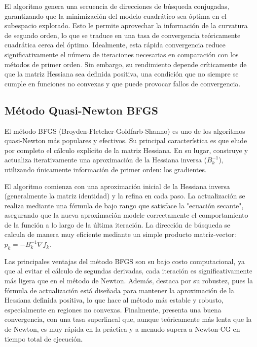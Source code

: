 \documentclass{article}
\begin{document}
El algoritmo genera una secuencia de direcciones de búsqueda conjugadas, garantizando que la minimización del modelo cuadrático sea óptima en el subespacio explorado. Esto le permite aprovechar la información de la curvatura de segundo orden, lo que se traduce en una tasa de convergencia teóricamente cuadrática cerca del óptimo. Idealmente, esta rápida convergencia reduce significativamente el número de iteraciones necesarias en comparación con los métodos de primer orden. Sin embargo, su rendimiento depende críticamente de que la matriz Hessiana sea definida positiva, una condición que no siempre se cumple en funciones no convexas y que puede provocar fallos de convergencia.

\subsection{Método Quasi-Newton BFGS}

El método BFGS (Broyden-Fletcher-Goldfarb-Shanno) es uno de los algoritmos quasi-Newton más populares y efectivos. Su principal característica es que elude por completo el cálculo explícito de la matriz Hessiana. En su lugar, construye y actualiza iterativamente una aproximación de la Hessiana inversa ($B_k^{-1}$), utilizando únicamente información de primer orden: los gradientes.

El algoritmo comienza con una aproximación inicial de la Hessiana inversa (generalmente la matriz identidad) y la refina en cada paso. La actualización se realiza mediante una fórmula de bajo rango que satisface la "ecuación secante", asegurando que la nueva aproximación modele correctamente el comportamiento de la función a lo largo de la última iteración. La dirección de búsqueda se calcula de manera muy eficiente mediante un simple producto matriz-vector: $p_k = -B_k^{-1} \nabla f_k$.

Las principales ventajas del método BFGS son su bajo costo computacional, ya que al evitar el cálculo de segundas derivadas, cada iteración es significativamente más ligera que en el método de Newton. Además, destaca por su robustez, pues la fórmula de actualización está diseñada para mantener la aproximación de la Hessiana definida positiva, lo que hace al método más estable y robusto, especialmente en regiones no convexas. Finalmente, presenta una buena convergencia, con una tasa superlineal que, aunque teóricamente más lenta que la de Newton, es muy rápida en la práctica y a menudo supera a Newton-CG en tiempo total de ejecución.
\end{document}
